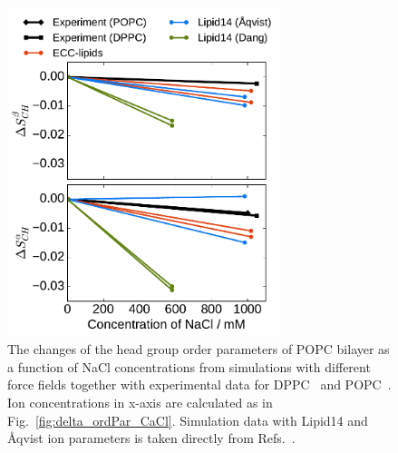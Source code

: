 \documentclass[aip,jcp,twocolumn]{revtex4}
\begin{document}
\begin{figure}[htb!]
  \centering
  \includegraphics[width=8.0cm]{../Fig/ipython_nb/OrdPars-A-B_L14-ECCL17_q80_sig89_NaCl.pdf}
  \caption{\label{fig:delta_ordPar_NaCl}
    The changes of the head group order parameters of POPC bilayer as a function of NaCl concentrations
    from simulations with different force fields together with experimental data for DPPC~\cite{akutsu81} and POPC~\cite{altenbach84}.
    Ion concentrations in x-axis are calculated as in Fig.~\ref{fig:delta_ordPar_CaCl}.
    Simulation data with Lipid14 and \AA{}qvist ion parameters is taken directly from
    Refs.~\cite{lipid14POPC0mMNaClfiles,lipid14POPC1000mMNaClfiles}.
  }
\end{figure}
\end{document}
